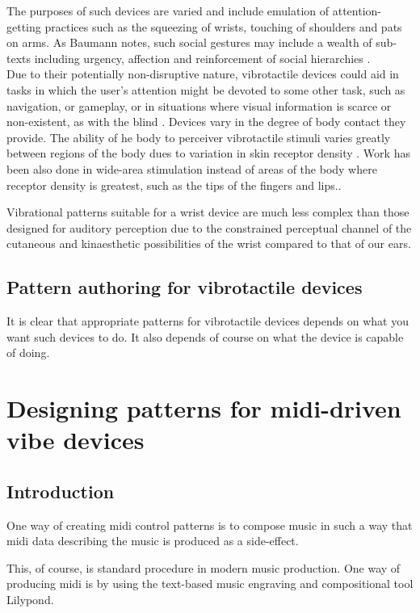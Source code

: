 \documentclass[a4paper, twocolumn]{article}
\begin{document}
The purposes of such devices are varied and include emulation of attention-getting practices such as the squeezing of wrists, touching of shoulders and pats on arms. As Baumann notes, such social gestures may include a wealth of sub-texts including urgency, affection and reinforcement of social hierarchies \cite{baumann2010emulating}.\\

Due to their potentially non-disruptive nature, vibrotactile devices could aid in tasks in which the user's attention might be devoted to some other task, such as navigation, or gameplay, or in situations where visual information is scarce or non-existent, as with the blind \cite{ertan1998wearable}.  Devices vary in the degree of body contact they provide. The ability of he body to perceiver vibrotactile stimuli varies greatly between regions of the body dues to variation in skin receptor density \cite{lindeman2006wearable}. Work has been also done in wide-area stimulation instead of areas of the body where receptor density is greatest, such as the tips of the fingers and lips.\cite{lindeman2004towards}.


Vibrational patterns suitable for a wrist device are much less complex than those designed for auditory perception due to the constrained perceptual channel of the cutaneous and kinaesthetic possibilities of the wrist compared to that of our ears.\\  

\subsection{Pattern authoring for vibrotactile devices}
It is clear that appropriate patterns for vibrotactile devices depends on what you want such devices to do. It also depends of course on what the device is capable of doing. 

\section{Designing patterns for midi-driven vibe devices}

\subsection{Introduction}
One way of creating midi control patterns is to compose music in such a way that midi data describing the music is produced as a side-effect.

This, of course, is standard procedure in modern music production. One way of producing midi is by using the text-based music engraving and compositional tool Lilypond.\\
\end{document}
